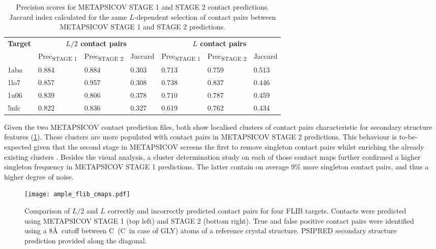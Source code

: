 \begin{table}[H]
  \centering
  \caption[Contact prediction summary for FLIB targets]{Precision scores for METAPSICOV \cite{Jones2015-wp} STAGE 1 and STAGE 2 contact predictions. Jaccard index calculated for the same $L$-dependent selection of contact pairs between METAPSICOV STAGE 1 and STAGE 2 predictions.}
  \label{table:ample_flib_contact_precision}
  \begin{tabularx}{\textwidth}{X X X X X X X}
      \hline
	  \multirow{2}{*}{\textbf{Target}} & \multicolumn{3}{c}{\textbf{$L/2$ contact pairs}} & \multicolumn{3}{c}{\textbf{$L$ contact pairs}} 	\\ \cline{2-7}
	  							&  	Prec\textsubscript{STAGE 1}	& 	Prec\textsubscript{STAGE 2}	& 	Jaccard 	& 	Prec\textsubscript{STAGE 1} 	& 	Prec\textsubscript{STAGE 2} 	& 	Jaccard	\\
	  \hline
	  1aba						&	0.884	&	0.884	&	0.303	&	0.713	&	0.759	&	0.513		\\
	  1lo7						&	0.857	&	0.957	&	0.308	&	0.738	&	0.837	&	0.446		\\
	  1u06						&	0.839	&	0.806	&	0.378	&	0.710	&	0.787	&	0.459		\\
	  5nfc						&	0.822	&	0.836	&	0.327	&	0.619	&	0.762	&	0.434		\\ 
	  \hline
  \end{tabularx}
\end{table}

Given the two METAPSICOV contact prediction files, both show localised clusters of contact pairs characteristic for secondary structure features (\cref{fig:ample_flib_cmaps}). These clusters are more populated with contact pairs in METAPSICOV STAGE 2 predictions. This behaviour is to-be-expected given that the second stage in METAPSICOV screens the first to remove singleton contact pairs whilst enriching the already existing clusters \cite{Jones2015-wp}. Besides the visual analysis, a cluster determination study on each of those contact maps further confirmed a higher singleton frequency in METAPSICOV STAGE 1 predictions. The latter contain on average 9\% more singleton contact pairs, and thus a higher degree of noise.

\begin{figure}[H]
	\centering
	\texttt{[image: ample\_flib\_cmaps.pdf]}
	\caption[Contact map comparison for FLIB targets]{Comparison of $L/2$ and $L$ correctly and incorrectly predicted contact pairs for four FLIB targets. Contacts were predicted using METAPSICOV \cite{Jones2015-wp} STAGE 1 (top left) and STAGE 2 (bottom right). True and false positive contact pairs were identified using a 8\AA\ cutoff between C\textalpha\ (C\textbeta\ in case of GLY) atoms of a reference crystal structure. PSIPRED \cite{Jones1999-fi} secondary structure prediction provided along the diagonal.}
	\label{fig:ample_flib_cmaps}
\end{figure}

